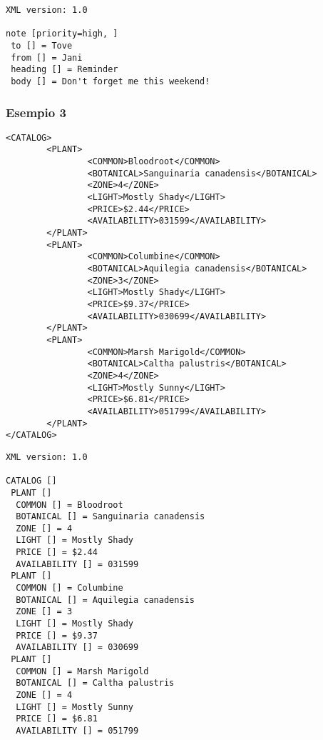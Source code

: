 \documentclass[italian,a4paper]{article}
\begin{document}
\begin{mdframed}[frametitle=Output]
\begin{verbatim}
XML version: 1.0

note [priority=high, ]
 to [] = Tove
 from [] = Jani
 heading [] = Reminder
 body [] = Don't forget me this weekend!
\end{verbatim}
\end{mdframed}

\subsubsection{Esempio 3}

\begin{mdframed}[frametitle=Input]
\begin{verbatim}
<CATALOG>
        <PLANT>
                <COMMON>Bloodroot</COMMON>
                <BOTANICAL>Sanguinaria canadensis</BOTANICAL>
                <ZONE>4</ZONE>
                <LIGHT>Mostly Shady</LIGHT>
                <PRICE>$2.44</PRICE>
                <AVAILABILITY>031599</AVAILABILITY>
        </PLANT>
        <PLANT>
                <COMMON>Columbine</COMMON>
                <BOTANICAL>Aquilegia canadensis</BOTANICAL>
                <ZONE>3</ZONE>
                <LIGHT>Mostly Shady</LIGHT>
                <PRICE>$9.37</PRICE>
                <AVAILABILITY>030699</AVAILABILITY>
        </PLANT>
        <PLANT>
                <COMMON>Marsh Marigold</COMMON>
                <BOTANICAL>Caltha palustris</BOTANICAL>
                <ZONE>4</ZONE>
                <LIGHT>Mostly Sunny</LIGHT>
                <PRICE>$6.81</PRICE>
                <AVAILABILITY>051799</AVAILABILITY>
        </PLANT>
</CATALOG>
\end{verbatim}
\end{mdframed}

\begin{mdframed}[frametitle=Output]
\begin{verbatim}
XML version: 1.0

CATALOG []
 PLANT []
  COMMON [] = Bloodroot
  BOTANICAL [] = Sanguinaria canadensis
  ZONE [] = 4
  LIGHT [] = Mostly Shady
  PRICE [] = $2.44
  AVAILABILITY [] = 031599
 PLANT []
  COMMON [] = Columbine
  BOTANICAL [] = Aquilegia canadensis
  ZONE [] = 3
  LIGHT [] = Mostly Shady
  PRICE [] = $9.37
  AVAILABILITY [] = 030699
 PLANT []
  COMMON [] = Marsh Marigold
  BOTANICAL [] = Caltha palustris
  ZONE [] = 4
  LIGHT [] = Mostly Sunny
  PRICE [] = $6.81
  AVAILABILITY [] = 051799
\end{verbatim}
\end{mdframed}
\end{document}
